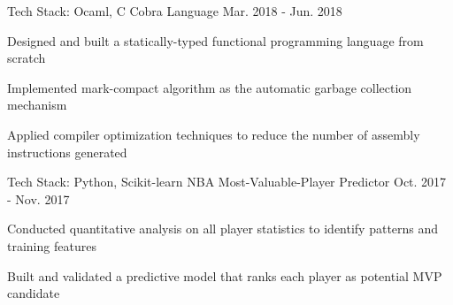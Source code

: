 

\begin{cventries}

\cventry
    {Tech Stack: Ocaml, C} %
    {Cobra Language} %
    {} %
    {Mar. 2018 - Jun. 2018} %
    {
      \begin{cvitems} %
        \item {Designed and built a statically-typed functional programming language from scratch}
        \item {Implemented mark-compact algorithm as the automatic garbage collection mechanism}
        \item {Applied compiler optimization techniques to reduce the number of assembly instructions generated}
      \end{cvitems}
    }
   
\cventry
    {Tech Stack: Python, Scikit-learn} %
    {NBA Most-Valuable-Player Predictor} %
    {} %
    {Oct. 2017 - Nov. 2017} %
    {
      \begin{cvitems} %
        \item {Conducted quantitative analysis on all player statistics to identify patterns and training features}
        \item {Built and validated a predictive model that ranks each player as potential MVP candidate}
      \end{cvitems}
    }

\end{cventries}
